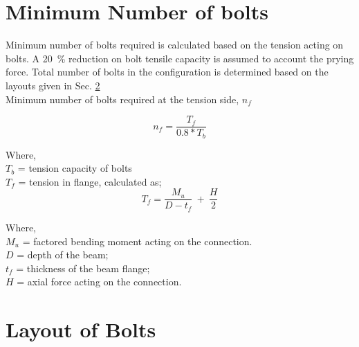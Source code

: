 \documentclass[11.5pt,a4paper,oneside]{report}
\begin{document}
\begin{Form}
\section{Minimum Number of bolts}
Minimum number of bolts required is calculated based on the tension acting on bolts. A 20~\% reduction on bolt tensile capacity is assumed to account the prying force. Total number of bolts in the configuration is determined based on the layouts given in Sec. \ref{layout} \\
Minimum number of bolts required at the tension side, $n_f$

\begin{equation}
	n_f = \frac{T_f}{0.8 * T_b}
\end{equation}

Where, \\
\indent $T_b$ = tension capacity of bolts \\
\indent $T_f$ = tension in flange, calculated as; \\

\begin{equation}
	T_{f} = \frac{M_u}{D - t_f} ~ + ~ \frac{H}{2}
\end{equation}

Where, \\
\indent $M_u$ = factored bending moment acting on the connection. \\
\indent $D$ = depth of the beam; \\
\indent $t_f$ = thickness of the beam flange; \\
\indent $H$ = axial force acting on the connection. \\


\section{Layout of Bolts}
\label{layout}

\end{Form}
\end{document}
